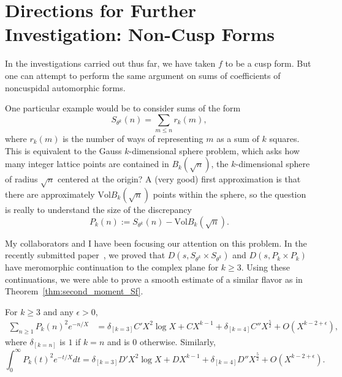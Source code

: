 \section{Directions for Further Investigation: Non-Cusp Forms}



In the investigations carried out thus far, we have taken $f$ to be a cusp form.
But one can attempt to perform the same argument on sums of coefficients of noncuspidal
automorphic forms.


One particular example would be to consider sums of the form
\begin{equation}
  S_{\theta^k}(n) = \sum_{m \leq n} r_k(m),
\end{equation}
where $r_k(m)$ is the number of ways of representing $m$ as a sum of $k$ squares.
This is equivalent to the Gauss $k$-dimensional sphere problem, which asks how many
integer lattice points are contained in $B_k(\sqrt n)$, the $k$-dimensional sphere of
radius $\sqrt{n}$ centered at the origin?
A (very good) first approximation is that there are approximately
$\text{Vol} B_k(\sqrt n)$ points within the sphere, so the question is really to
understand the size of the discrepancy
\begin{equation}
  P_k(n) := S_{\theta^k}(n) - \text{Vol} B_k(\sqrt n).
\end{equation}


My collaborators and I have been focusing our attention on this problem.
In the recently submitted paper~\cite{HulseGaussSphere}, we proved that
$D(s, S_{\theta^k} \times S_{\theta^k})$ and $D(s, P_k \times P_k)$ have meromorphic
continuation to the complex plane for $k \geq 3$.
Using these continuations, we were able to prove a smooth estimate of a similar flavor as
in Theorem~\ref{thm:second_moment_Sf}.


\begin{theorem}

  For $k \geq 3$ and any $\epsilon > 0$,
  \begin{equation}
    \begin{split}
      \sum_{n \geq 1} P_k(n)^2 e^{-n/X} &= \delta_{[k = 3]}C' X^2 \log X + C X^{k-1} +
      \delta_{[k = 4]} C'' X^{\frac{5}{2}} + O(X^{k - 2 + \epsilon}),
    \end{split}
  \end{equation}
  where $\delta_{[k = n]}$ is $1$ if $k = n$ and is $0$ otherwise.
  Similarly,
  \begin{equation}
    \int_0^\infty P_k(t)^2 e^{-t/X} dt = \delta_{[k = 3]}D' X^2 \log X + D X^{k-1} +
    \delta_{[k = 4]} D'' X^{\frac{5}{2}} + O(X^{k - 2 + \epsilon}).
  \end{equation}

\end{theorem}

